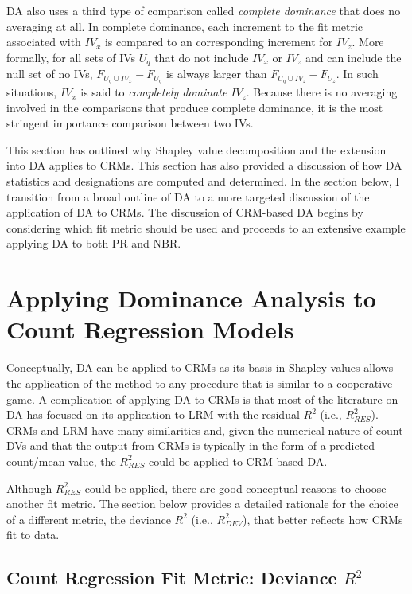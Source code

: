 \documentclass[ShortAfour,times,sageapa]{sagej}
\begin{document}
	DA also uses a third type of comparison called \emph{complete dominance} that does no averaging at all.
	In complete dominance, each increment to the fit metric associated with $IV_x$ is compared to an corresponding increment for $IV_z$.
	More formally, for all sets of IVs $U_q$ that do not include $IV_x$ or $IV_z$ and can include the null set of no IVs, $F_{U_q \cup IV_x} - F_{U_q}$ is always larger than $F_{U_q \cup IV_z} - F_{U_z}$.
	In such situations, $IV_x$ is said to \emph{completely dominate} $IV_z$.
	Because there is no averaging involved in the comparisons that produce complete dominance, it is the most stringent importance comparison between two IVs.
	
	This section has outlined why Shapley value decomposition and the extension into DA applies to CRMs. 
	This section has also provided a discussion of how DA statistics and designations are computed and determined.
	In the section below, I transition from a broad outline of DA to a more targeted discussion of the application of DA to CRMs.
	The discussion of CRM-based DA begins by considering which fit metric should be used and proceeds to an extensive example applying DA to both PR and NBR.
	
\section{Applying Dominance Analysis to Count Regression Models}

	Conceptually, DA can be applied to CRMs as its basis in Shapley values allows the application of the method to any procedure that is similar to a cooperative game.
	A complication of applying DA to CRMs is that most of the literature on DA has focused on its application to LRM with the residual $R^2$ (i.e., $R^2_{RES}$).
	CRMs and LRM have many similarities and, given the numerical nature of count DVs and that the output from CRMs is typically in the form of a predicted count/mean value, the $R^2_{RES}$ could be applied to CRM-based DA.
	
	Although $R^2_{RES}$ could be applied, there are good conceptual reasons to choose another fit metric. 
	The section below provides a detailed rationale for the choice of a different metric, the deviance $R^2$ (i.e., $R^2_{DEV}$), that better reflects how CRMs fit to data. 
	
	\subsection{Count Regression Fit Metric: Deviance $R^2$}
	
\end{document}

